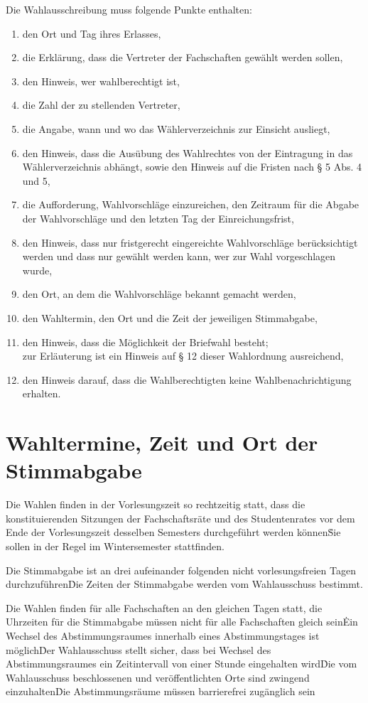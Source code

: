 \begin{multicols}{2}
\Abs \Satz Die Wahlausschreibung muss folgende Punkte enthalten:
\begin{enumerate}
\item den Ort und Tag ihres Erlasses,
\item die Erklärung, dass die Vertreter der Fachschaften gewählt werden sollen,
\item den Hinweis, wer wahlberechtigt ist,
\item die Zahl der zu stellenden Vertreter,
\item die Angabe, wann und wo das Wählerverzeichnis zur Einsicht ausliegt,
\item den Hinweis, dass die Ausübung des Wahlrechtes von der Eintragung in das Wählerverzeichnis abhängt, sowie den Hinweis auf die Fristen nach § 5 Abs. 4 und 5,
\item die Aufforderung, Wahlvorschläge einzureichen, den Zeitraum für die Abgabe der Wahlvorschläge und den letzten Tag der Einreichungsfrist,
\item den Hinweis, dass nur fristgerecht eingereichte Wahlvorschläge berücksichtigt werden und dass nur gewählt werden kann, wer zur Wahl vorgeschlagen wurde,
\item den Ort, an dem die Wahlvorschläge bekannt gemacht werden,
\item den Wahltermin, den Ort und die Zeit der jeweiligen Stimmabgabe,
\item den Hinweis, dass die Möglichkeit der Briefwahl besteht;\\ zur Erläuterung ist ein Hinweis auf § 12 dieser Wahlordnung ausreichend,
\item den Hinweis darauf, dass die Wahlberechtigten keine Wahlbenachrichtigung erhalten.
\end{enumerate}

\section{Wahltermine, Zeit und Ort der Stimmabgabe}
\Abs \Satz Die Wahlen finden in der Vorlesungszeit so rechtzeitig statt, dass die konstituierenden Sitzungen der Fachschaftsräte und des Studentenrates vor dem Ende der Vorlesungszeit desselben Semesters durchgeführt werden können\. Sie sollen in der Regel im Wintersemester stattfinden.

\Abs \Satz Die Stimmabgabe ist an drei aufeinander folgenden nicht vorlesungsfreien Tagen durchzuführen\. Die Zeiten der Stimmabgabe werden vom Wahlausschuss bestimmt.

\Abs \Satz Die Wahlen finden für alle Fachschaften an den gleichen Tagen statt, die Uhrzeiten für die Stimmabgabe müssen nicht für alle Fachschaften gleich sein\. Ein Wechsel des Abstimmungsraumes innerhalb eines Abstimmungstages ist möglich\. Der Wahlausschuss stellt sicher, dass bei Wechsel des Abstimmungsraumes ein Zeitintervall von einer Stunde eingehalten wird\. Die vom Wahlausschuss beschlossenen und veröffentlichten Orte sind zwingend einzuhalten\. Die Abstimmungsräume müssen barrierefrei zugänglich sein


\end{multicols}
